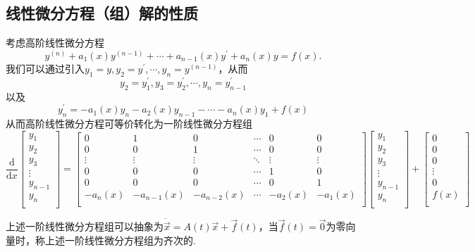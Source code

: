 \documentclass{ctexart}
\begin{document}
\subsection{线性微分方程（组）解的性质}
考虑高阶线性微分方程
$$y^{(n)}+a_{1}(x)y^{(n-1)}+\cdots+a_{n-1}(x)y^{\prime}+a_{n}(x)y=f(x).$$
我们可以通过引入$y_{1}=y,y_{2}=y^{\prime},\cdots,y_{n}=y^{(n-1)}$，从而
$$y_{2}=y_{1}^{\prime},y_{3}=y_{2}^{\prime},\cdots,y_{n}=y_{n-1}^{\prime}$$
以及
$$y_{n}^{\prime}=-a_{1}(x)y_{n}-a_{2}(x)y_{n-1}-\cdots-a_{n}(x)y_{1}+f(x)$$
从而高阶线性微分方程可等价转化为一阶线性微分方程组
$$\frac{\mathrm{d}}{\mathrm{d}x}\begin{bmatrix}y_{1}\\ y_{2}\\ y_{3}\\ \vdots \\ y_{n-1}\\ y_{n}\\\end{bmatrix}=\begin{bmatrix}0&1&0&\cdots&0&0\\ 0&0&1&\cdots&0&0\\ \vdots&\vdots&\vdots&\ddots&\vdots&\vdots\\ 0&0&0&\cdots&1&0\\0&0&0&\cdots&0&1\\ -a_{n}(x)&-a_{n-1}(x)&-a_{n-2}(x)&\cdots&-a_{2}(x)&-a_{1}(x)\\\end{bmatrix}\begin{bmatrix}y_{1}\\ y_{2}\\ y_{3}\\ \vdots \\ y_{n-1}\\ y_{n}\\\end{bmatrix}+\begin{bmatrix}0\\ 0\\ 0\\ \vdots \\ 0\\ f(x)\\\end{bmatrix}$$

上述一阶线性微分方程组可以抽象为$\dot{\vec{x}}=A(t)\vec{x}+\vec{f}(t)$，当$\vec{f}(t)=\vec{0}$为零向量时，称上述一阶线性微分方程组为齐次的.
\end{document}
